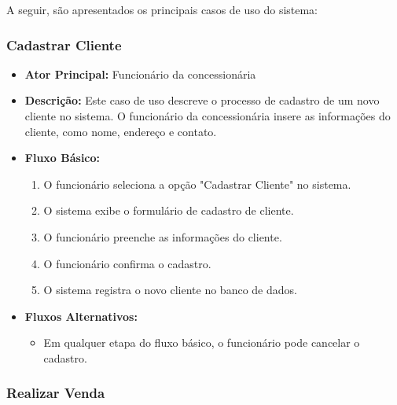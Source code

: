 A seguir, são apresentados os principais casos de uso do sistema:

\subsubsection{Cadastrar Cliente}

\begin{itemize}
	\item \textbf{Ator Principal:} Funcionário da concessionária
	\item \textbf{Descrição:} Este caso de uso descreve o processo de cadastro de um novo cliente no sistema. O funcionário da concessionária insere as informações do cliente, como nome, endereço e contato.
	\item \textbf{Fluxo Básico:}
	\begin{enumerate}
		\item O funcionário seleciona a opção "Cadastrar Cliente" no sistema.
		\item O sistema exibe o formulário de cadastro de cliente.
		\item O funcionário preenche as informações do cliente.
		\item O funcionário confirma o cadastro.
		\item O sistema registra o novo cliente no banco de dados.
	\end{enumerate}
	\item \textbf{Fluxos Alternativos:}
	\begin{itemize}
		\item Em qualquer etapa do fluxo básico, o funcionário pode cancelar o cadastro.
	\end{itemize}
\end{itemize}

\subsubsection{Realizar Venda}

